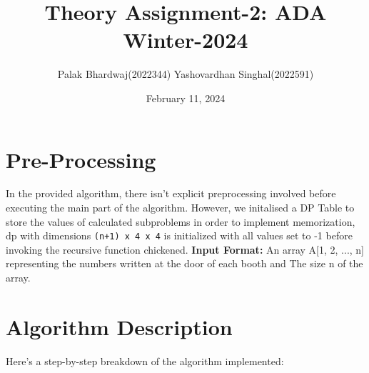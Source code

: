 \documentclass[8pt]{article}
\title{\vspace{-3em}Theory Assignment-2: ADA Winter-2024}
\author{Palak Bhardwaj(2022344) \phantom{fddvdssvs}Yashovardhan Singhal(2022591)}
\date{February 11, 2024}
\begin{document}
\maketitle


\section{Pre-Processing}
In the provided algorithm, there isn't explicit preprocessing involved before executing the main part of the algorithm.
\newline
However, we initalised a DP Table to store the values of calculated subproblems in order to implement memorization, dp with dimensions \texttt{(n+1) x 4 x 4} is initialized with all values set to -1 before invoking the recursive function chickened.
\newline
\textbf{Input Format:} An array A[1, 2, ..., n] representing the numbers written at the door of each booth and The size n of the array.

\section{Algorithm Description}


Here's a step-by-step breakdown of the algorithm implemented:
\end{document}
